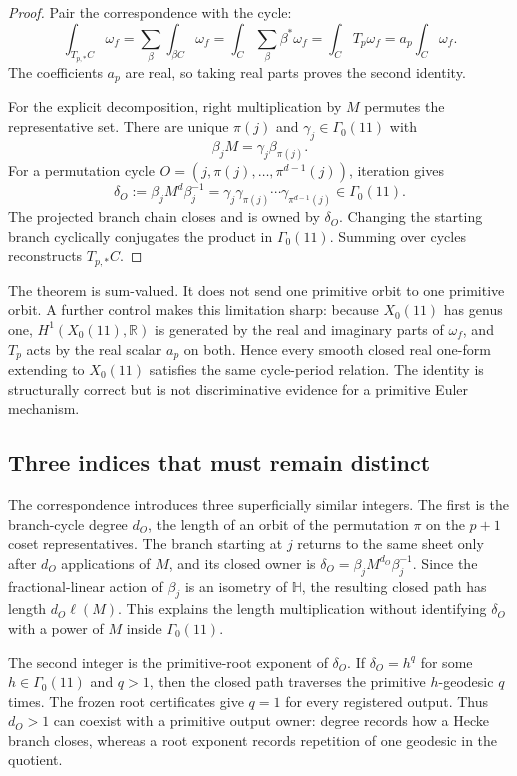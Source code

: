 \documentclass[11pt]{article}
\theoremstyle{definition}
\theoremstyle{remark}
\newcommand{\G}{\Gamma_0(11)}
\newcommand{\HH}{\mathbb H}
\newcommand{\RR}{\mathbb R}
\begin{document}
\begin{proof}
Pair the correspondence with the cycle:
\[
\int_{T_{p,*}C}\omega_f
=\sum_\beta\int_{\beta C}\omega_f
=\int_C\sum_\beta\beta^*\omega_f
=\int_CT_p\omega_f
=a_p\int_C\omega_f.
\]
The coefficients $a_p$ are real, so taking real parts proves the second identity.

For the explicit decomposition, right multiplication by $M$ permutes the representative set. There are unique $\pi(j)$ and $\gamma_j\in\G$ with
\[
\beta_jM=\gamma_j\beta_{\pi(j)}.
\]
For a permutation cycle $O=(j,\pi(j),\ldots,\pi^{d-1}(j))$, iteration gives
\[
\delta_O:=\beta_jM^d\beta_j^{-1}
=\gamma_j\gamma_{\pi(j)}\cdots\gamma_{\pi^{d-1}(j)}\in\G.
\]
The projected branch chain closes and is owned by $\delta_O$. Changing the starting branch cyclically conjugates the product in $\G$. Summing over cycles reconstructs $T_{p,*}C$.
\end{proof}

The theorem is sum-valued. It does not send one primitive orbit to one primitive orbit. A further control makes this limitation sharp: because $X_0(11)$ has genus one, $H^1(X_0(11),\RR)$ is generated by the real and imaginary parts of $\omega_f$, and $T_p$ acts by the real scalar $a_p$ on both. Hence every smooth closed real one-form extending to $X_0(11)$ satisfies the same cycle-period relation. The identity is structurally correct but is not discriminative evidence for a primitive Euler mechanism.

\subsection{Three indices that must remain distinct}

The correspondence introduces three superficially similar integers. The first is the branch-cycle degree $d_O$, the length of an orbit of the permutation $\pi$ on the $p+1$ coset representatives. The branch starting at $j$ returns to the same sheet only after $d_O$ applications of $M$, and its closed owner is $\delta_O=\beta_jM^{d_O}\beta_j^{-1}$. Since the fractional-linear action of $\beta_j$ is an isometry of $\HH$, the resulting closed path has length $d_O\ell(M)$. This explains the length multiplication without identifying $\delta_O$ with a power of $M$ inside $\G$.

The second integer is the primitive-root exponent of $\delta_O$. If $\delta_O=h^q$ for some $h\in\G$ and $q>1$, then the closed path traverses the primitive $h$-geodesic $q$ times. The frozen root certificates give $q=1$ for every registered output. Thus $d_O>1$ can coexist with a primitive output owner: degree records how a Hecke branch closes, whereas a root exponent records repetition of one geodesic in the quotient.
\end{document}
